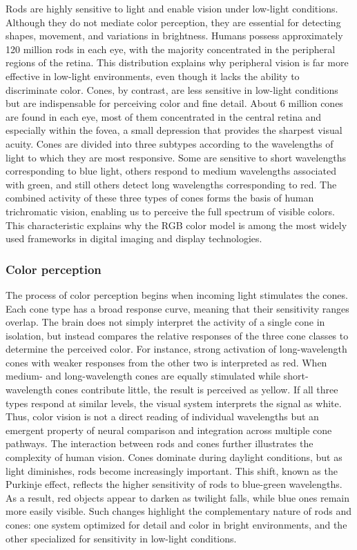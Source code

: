 \documentclass{article}
\begin{document}
Rods are highly sensitive to light and enable vision under low-light conditions. 
Although they do not mediate color perception, they are essential for detecting shapes, movement, and variations in brightness. 
Humans possess approximately 120 million rods in each eye, with the majority concentrated in the peripheral regions of the retina. 
This distribution explains why peripheral vision is far more effective in low-light environments, even though it lacks the ability to discriminate color.
Cones, by contrast, are less sensitive in low-light conditions but are indispensable for perceiving color and fine detail.
About 6 million cones are found in each eye, most of them concentrated in the central retina and especially within the fovea, a small depression that provides the sharpest visual acuity.
Cones are divided into three subtypes according to the wavelengths of light to which they are most responsive.
Some are sensitive to short wavelengths corresponding to blue light, others respond to medium wavelengths associated with green, and still others detect long wavelengths corresponding to red. 
The combined activity of these three types of cones forms the basis of human trichromatic vision, enabling us to perceive the full spectrum of visible colors.
This characteristic explains why the RGB color model is among the most widely used frameworks in digital imaging and display technologies.

\subsubsection{Color perception}

The process of color perception begins when incoming light stimulates the cones. 
Each cone type has a broad response curve, meaning that their sensitivity ranges overlap. 
The brain does not simply interpret the activity of a single cone in isolation, but instead compares the relative responses of the three cone classes to determine the perceived color. 
For instance, strong activation of long-wavelength cones with weaker responses from the other two is interpreted as red. 
When medium- and long-wavelength cones are equally stimulated while short-wavelength cones contribute little, the result is perceived as yellow. 
If all three types respond at similar levels, the visual system interprets the signal as white. 
Thus, color vision is not a direct reading of individual wavelengths but an emergent property of neural comparison and integration across multiple cone pathways.
The interaction between rods and cones further illustrates the complexity of human vision.
Cones dominate during daylight conditions, but as light diminishes, rods become increasingly important.
This shift, known as the Purkinje effect, reflects the higher sensitivity of rods to blue-green wavelengths.
As a result, red objects appear to darken as twilight falls, while blue ones remain more easily visible. 
Such changes highlight the complementary nature of rods and cones: one system optimized for detail and color in bright environments, and the other specialized for sensitivity in low-light conditions.
\end{document}
